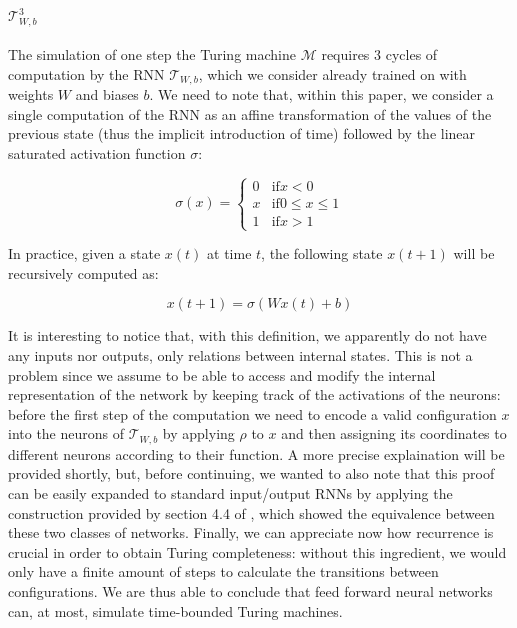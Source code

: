 \documentclass{article}
\begin{document}
\paragraph{$\mathcal{T}_{W,b}^3$} The simulation of one step the Turing machine $\mathcal{M}$ requires $3$ cycles of computation by the RNN $\mathcal{T}_{W,b}$, which we consider already trained on with weights $W$ and biases $b$. We need to note that, within this paper, we consider a single computation of the RNN as an affine transformation of the values of the previous state (thus the implicit introduction of time) followed by the linear saturated activation function $\sigma$:

    \begin{equation}
        \sigma(x)=
            \begin{cases}
                0 & \text{if} x < 0\\
                x & \text{if} 0 \leq x \leq 1\\
                1 & \text{if} x > 1
            \end{cases} 
    \end{equation}

In practice, given a state $x(t)$ at time $t$, the following state $x(t+1)$ will be recursively computed as:

    \begin{equation}\label{eq:rnnformula}
        x(t+1) = \sigma(Wx(t) + b)
    \end{equation}

It is interesting to notice that, with this definition, we apparently do not have any inputs nor outputs, only relations between internal states. This is not a problem since we assume to be able to access and modify the internal representation of the network by keeping track of the activations of the neurons: before the first step of the computation we need to encode a valid configuration $x$ into the neurons of $\mathcal{T}_{W,b}$ by applying $\rho$ to $x$ and then assigning its coordinates to different neurons according to their function. A more precise explaination will be provided shortly, but, before continuing, we wanted to also note that this proof can be easily expanded to standard input/output RNNs by applying the construction provided by section 4.4 of \cite{SIE95}, which showed the equivalence between these two classes of networks. Finally, we can appreciate now how recurrence is crucial in order to obtain Turing completeness: without this ingredient, we would only have a finite amount of steps to calculate the transitions between configurations. We are thus able to conclude that feed forward neural networks can, at most, simulate time-bounded Turing machines.
\end{document}
